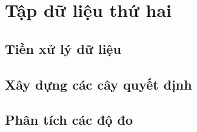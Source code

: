 \section{Tập dữ liệu thứ hai}
\subsection{Tiền xử lý dữ liệu}
\subsection{Xây dựng các cây quyết định}
\subsection{Phân tích các độ đo}